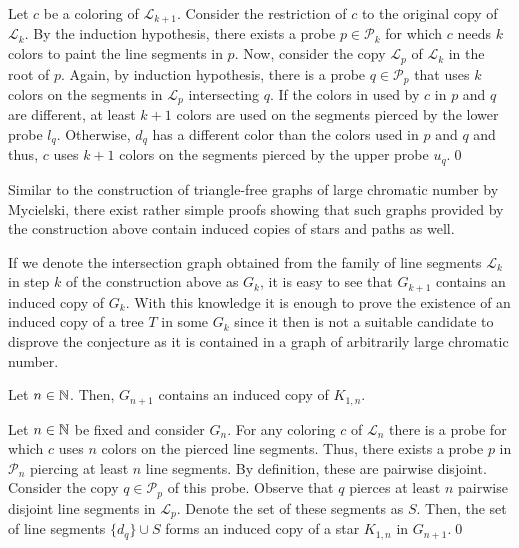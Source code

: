 \begin{prf}
Let $c$ be a coloring of $\mathcal{L}_{k+1}$. Consider the restriction of $c$ to the original copy of $\mathcal{L}_k$. By the induction hypothesis, there exists a probe $p\in\mathcal{P}_k$ for which $c$ needs $k$ colors to paint the line segments in $p$. Now, consider the copy $\mathcal{L}_p$ of $\mathcal{L}_k$ in the root of $p$. Again, by induction hypothesis, there is a probe $q\in\mathcal{P}_p$ that uses $k$ colors on the segments in $\mathcal{L}_p$ intersecting $q$. If the colors in used by $c$ in $p$ and $q$ are different, at least $k+1$ colors are used on the segments pierced by the lower probe $l_q$. Otherwise, $d_q$ has a different color than the colors used in $p$ and $q$ and thus, $c$ uses $k+1$ colors on the segments pierced by the upper probe $u_q$.\qed
\end{prf}

Similar to the construction of triangle-free graphs of large chromatic number by Mycielski, there exist rather simple proofs showing that such graphs provided by the construction above contain induced copies of stars and paths as well.

\begin{note}
If we denote the intersection graph obtained from the family of line segments $\mathcal{L}_k$ in step $k$ of the construction above as $G_k$, it is easy to see that $G_{k+1}$ contains an induced copy of $G_k$. With this knowledge it is enough to prove the existence of an induced copy of a tree $T$ in some $G_k$ since it then is not a suitable candidate to disprove the conjecture as it is contained in a graph of arbitrarily large chromatic number.
\end{note}

\begin{thm}
Let $n\in\mathbb{N}$. Then, $G_{n+1}$ contains an induced copy of $K_{1,n}$.
\end{thm}
\begin{prf}
Let $n\in\mathbb{N}$ be fixed and consider $G_n$. For any coloring $c$ of $\mathcal{L}_n$ there is a probe for which $c$ uses $n$ colors on the pierced line segments. Thus, there exists a probe $p$ in $\mathcal{P}_n$ piercing at least $n$ line segments. By definition, these are pairwise disjoint. Consider the copy $q\in\mathcal{P}_p$ of this probe. Observe that $q$ pierces at least $n$ pairwise disjoint line segments in $\mathcal{L}_p$. Denote the set of these segments as $S$. Then, the set of line segments $\lbrace d_q\rbrace\cup S$ forms an induced copy of a star $K_{1,n}$ in $G_{n+1}$.\qed   
\end{prf}

